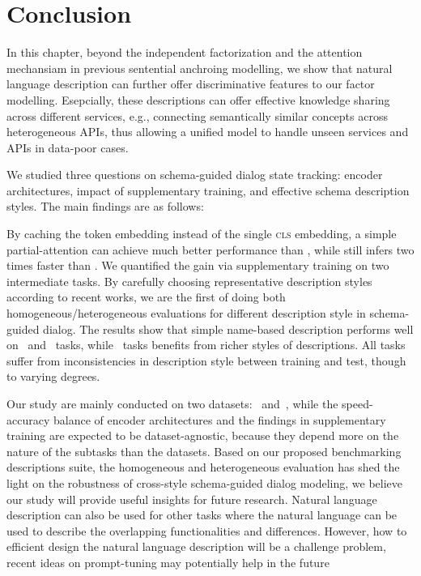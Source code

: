 \section{Conclusion}
\label{sec:conclusion}
In this chapter, beyond the independent factorization and the
attention mechansiam in previous sentential anchroing modelling, we
show that natural language description can further offer
discriminative features to our factor modelling. Esepcially, these
descriptions can offer effective knowledge sharing across different
services, e.g., connecting semantically similar concepts across
heterogeneous APIs, thus allowing a unified model to handle unseen
services and APIs in data-poor cases.

We studied three questions on schema-guided dialog state tracking:
encoder architectures, impact of supplementary training, and effective
schema description styles.  The main findings are as follows:

By caching the token embedding instead of the single \textsc{cls}
embedding, a simple partial-attention \FE can achieve much better
performance than \DE, while still infers two times faster than \CE.
We quantified the gain via supplementary training on two intermediate
tasks.  By carefully choosing representative description styles
according to recent works, we are the first of doing both
homogeneous/heterogeneous evaluations for different description style
in schema-guided dialog. The results show that simple name-based
description performs well on \IC~and \RSI~tasks, while \NSL~tasks
benefits from richer styles of descriptions.  All tasks suffer from
inconsistencies in description style between training and test, though
to varying degrees.

Our study are mainly conducted on two datasets: \sgdst~and~\multiwoz,
while the speed-accuracy balance of encoder architectures and the
findings in supplementary training are expected to be
dataset-agnostic, because they depend more on the nature of the
subtasks than the datasets. Based on our proposed benchmarking
descriptions suite, the homogeneous and heterogeneous evaluation has
shed the light on the robustness of cross-style schema-guided dialog
modeling, we believe our study will provide useful insights for future
research. Natural language description can also be used for other
tasks where the natural language can be used to describe the
overlapping functionalities and differences. However, how to efficient
design the natural language description will be a challenge problem,
recent ideas on prompt-tuning may potentially help in the
future~\cite{schucher2022power,ye2022ontology}



